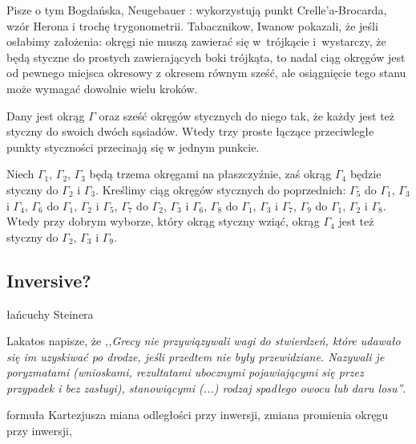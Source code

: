 Pisze o tym Bogdańska, Neugebauer \cite[s. 101]{neugebauer_2018}: wykorzystują punkt Crelle'a-Brocarda, wzór Herona i trochę trygonometrii.
Tabacznikow, Iwanow \cite{ivanov_tabachnikov_2016} pokazali, że jeśli osłabimy założenia: okręgi nie muszą zawierać się w~trójkącie i~wystarczy, że będą styczne do prostych zawierających boki trójkąta, to nadal ciąg okręgów jest od pewnego miejsca okresowy z okresem równym sześć, ale osiągnięcie tego stanu może wymagać dowolnie wielu kroków.
%
%

\begin{proposition}
%
	Dany jest okrąg $\Gamma$ oraz sześć okręgów stycznych do niego tak, że każdy jest też styczny do swoich dwóch sąsiadów.
	Wtedy trzy proste łączące przeciwległe punkty styczności przecinają się w jednym punkcie.
\end{proposition}

\begin{proposition}
%
	Niech $\Gamma_1$, $\Gamma_2$, $\Gamma_3$ będą trzema okręgami na płaszczyźnie, zaś okrąg $\Gamma_4$ będzie styczny do $\Gamma_2$ i $\Gamma_3$.
	Kreślimy ciąg okręgów stycznych do poprzednich:
	$\Gamma_5$ do $\Gamma_1$, $\Gamma_3$ i $\Gamma_4$,
	$\Gamma_6$ do $\Gamma_1$, $\Gamma_2$ i $\Gamma_5$,
	$\Gamma_7$ do $\Gamma_2$, $\Gamma_3$ i $\Gamma_6$,
	$\Gamma_8$ do $\Gamma_1$, $\Gamma_3$ i $\Gamma_7$,
	$\Gamma_9$ do $\Gamma_1$, $\Gamma_2$ i $\Gamma_8$.
	Wtedy przy dobrym wyborze, który okrąg styczny wziąć, okrąg $\Gamma_4$ jest też styczny do $\Gamma_2$, $\Gamma_3$ i $\Gamma_9$.
\end{proposition}

\subsection{Inversive?}
łańcuchy Steinera %

Lakatos napisze, że \emph{,,Grecy nie przywiązywali wagi do stwierdzeń, które udawało się im uzyskiwać po drodze, jeśli przedtem nie były przewidziane.
Nazywali je poryzmatami (wnioskami, rezultatami ubocznymi pojawiającymi się przez przypadek i bez zasługi), stanowiącymi (...) rodzaj spadłego owocu lub daru losu''}. %


formuła Kartezjusza %
miana odległości przy inwersji, zmiana promienia okręgu przy inwersji, %

